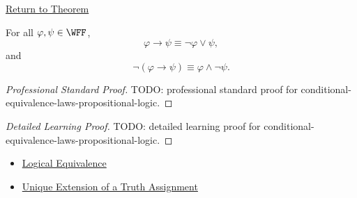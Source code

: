 \newpage
{}
\label{prf:conditional-equivalence-laws-propositional-logic}

\begin{remark*}[Return]
\hyperref[thm:conditional-equivalence-laws-propositional-logic]{Return to Theorem}
\end{remark*}

\begin{theorem*}
For all \(\varphi,\psi\in\WFF\),
\[
\varphi\to\psi
\equiv
\neg\varphi\lor\psi,
\]
and
\[
\neg(\varphi\to\psi)
\equiv
\varphi\land\neg\psi.
\]
\end{theorem*}

\begin{proof}[Professional Standard Proof]
\LRAProofBodyStart
TODO: professional standard proof for conditional-equivalence-laws-propositional-logic.
\end{proof}

\begin{proof}[Detailed Learning Proof]
\LRAProofBodyStart
TODO: detailed learning proof for conditional-equivalence-laws-propositional-logic.
\end{proof}

\begin{remark*}
\end{remark*}

\begin{dependencies}
\begin{itemize}
  \item \hyperref[def:logical-equivalence-propositional-logic]{Logical Equivalence}
  \item \hyperref[thm:unique-extension-truth-assignment-propositional-logic]{Unique Extension of a Truth Assignment}
\end{itemize}
\end{dependencies}

\clearpage
